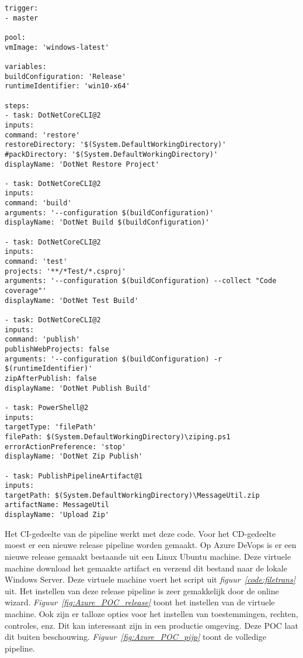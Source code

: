 \begin{lstlisting}
trigger:
- master

pool:
vmImage: 'windows-latest'

variables:
buildConfiguration: 'Release'
runtimeIdentifier: 'win10-x64'

steps:
- task: DotNetCoreCLI@2
inputs:
command: 'restore'
restoreDirectory: '$(System.DefaultWorkingDirectory)'
#packDirectory: '$(System.DefaultWorkingDirectory)'
displayName: 'DotNet Restore Project'

- task: DotNetCoreCLI@2
inputs:
command: 'build'
arguments: '--configuration $(buildConfiguration)'
displayName: 'DotNet Build $(buildConfiguration)'

- task: DotNetCoreCLI@2
inputs:
command: 'test'
projects: '**/*Test/*.csproj'
arguments: '--configuration $(buildConfiguration) --collect "Code coverage"'
displayName: 'DotNet Test Build'

- task: DotNetCoreCLI@2
inputs:
command: 'publish'
publishWebProjects: false
arguments: '--configuration $(buildConfiguration) -r $(runtimeIdentifier)'
zipAfterPublish: false
displayName: 'DotNet Publish Build'

- task: PowerShell@2
inputs:
targetType: 'filePath'
filePath: $(System.DefaultWorkingDirectory)\ziping.ps1
errorActionPreference: 'stop'
displayName: 'DotNet Zip Publish'

- task: PublishPipelineArtifact@1
inputs:
targetPath: $(System.DefaultWorkingDirectory)\MessageUtil.zip
artifactName: MessageUtil
displayName: 'Upload Zip'
\end{lstlisting}

Het CI-gedeelte van de pipeline werkt met deze code. Voor het CD-gedeelte moest er een nieuwe release pipeline worden gemaakt. Op Azure DeVops is er een nieuwe release gemaakt bestaande uit een Linux Ubuntu machine. Deze virtuele machine download het gemaakte artifact en verzend dit bestand naar de lokale Windows Server. Deze virtuele machine voert het script uit \emph{figuur~\ref{code:filetrans}} uit. Het instellen van deze release pipeline is zeer gemakkelijk door de online wizard. \emph{Figuur~\ref{fig:Azure_POC_release}} toont het instellen van de virtuele machine. Ook zijn er talloze opties voor het instellen van toestemmingen, rechten, controles, enz. Dit kan interessant zijn in een productie omgeving. Deze POC laat dit buiten beschouwing. \emph{Figuur~\ref{fig:Azure_POC_pijp}} toont de volledige pipeline.


